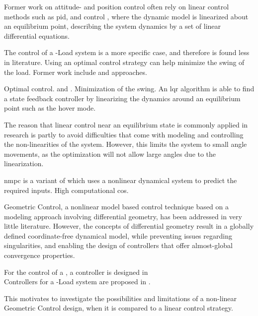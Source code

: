 Former work on  attitude- and position control often rely on linear control methods such as \acs{pid}\cite{bibid}, \cite{Bangura2014} and  control \cite{bibid}, where the dynamic model is linearized about an equilibrium point, describing the system dynamics by a set of linear differential equations. 

The control of a -Load system is a more specific case, and therefore is found less in literature. 
Using an optimal control strategy can help minimize the swing of the load. Former work include \cite{PraveenThesis} and \cite{bibid} approaches. 


Optimal control.  and . Minimization of the swing.
An \acf{lqr} algorithm is able to find a state feedback controller by linearizing the dynamics around an equilibrium point such as the hover mode.

The reason that linear control near an equilibrium state is commonly applied in research is partly to avoid difficulties that come with modeling and controlling the non-linearities of the system. However, this limits the system to small angle movements, as the optimization will not allow large angles due to the linearization.
 
\acs{nmpc} is a variant of  which uses a nonlinear dynamical system to predict the required inputs.
High computational cos.

Geometric Control, a nonlinear model based control technique based on a modeling approach involving differential geometry, has been addressed in very little literature. However, the concepts of differential geometry result in a globally defined coordinate-free dynamical model, while preventing issues regarding singularities, and enabling the design of controllers that offer almost-global convergence properties.

For the control of a , a  controller is designed in \cite{Goodarzi2013a}\\

Controllers for a -Load system are proposed in \cite{Sreenath2013b,Tang2015}.


This motivates to investigate the possibilities and limitations of a non-linear Geometric Control design, when it is compared to a linear control strategy.

